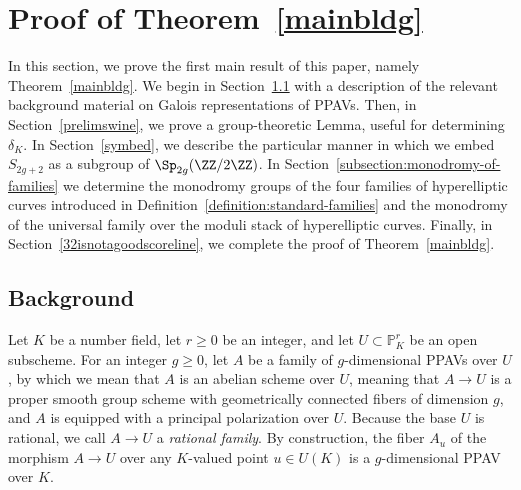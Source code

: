 \section{Proof of Theorem~\ref{mainbldg}}
\label{section:proof-of-mainbldg}

In this section, we prove the first main result of this paper, namely Theorem~\ref{mainbldg}. We begin in Section~\ref{mygawdsadiomaneisamazing} with a description of the relevant background material on Galois representations of PPAVs. Then, in Section~\ref{prelimswine}, 
we prove a group-theoretic Lemma, useful for determining $\delta_K$.
In Section~\ref{symbed}, we describe the particular manner in which we embed $S_{2g+2}$ as a subgroup of $\Sp_{2g}(\ZZ/2 \ZZ)$.
In Section~\ref{subsection:monodromy-of-families}
we determine the monodromy groups of the four families of hyperelliptic curves introduced in Definition~\ref{definition:standard-families} and the monodromy of the universal family over the moduli stack of hyperelliptic curves. Finally, in Section~\ref{32isnotagoodscoreline}, we complete the proof of Theorem~\ref{mainbldg}.

\subsection{Background}\label{mygawdsadiomaneisamazing}

Let $K$ be a number field, let $r \geq 0$ be an integer, and let $U \subset \mathbb{P}_K^r$ be an open subscheme. For an integer $g \geq 0$, let $A$ be a family of $g$-dimensional PPAVs over $U$, by which we mean that $A$ is an abelian scheme over $U$, meaning that $A \rightarrow U$ is a proper smooth group scheme with geometrically connected fibers of dimension $g$, and $A$ is equipped with a principal polarization over $U$.  Because the base $U$ is rational, we call $A \to U$ a \emph{rational family}. By construction, the fiber $A_u$ of the morphism $A \to U$ over any $K$-valued point $u \in U(K)$ is a $g$-dimensional PPAV over $K$.

